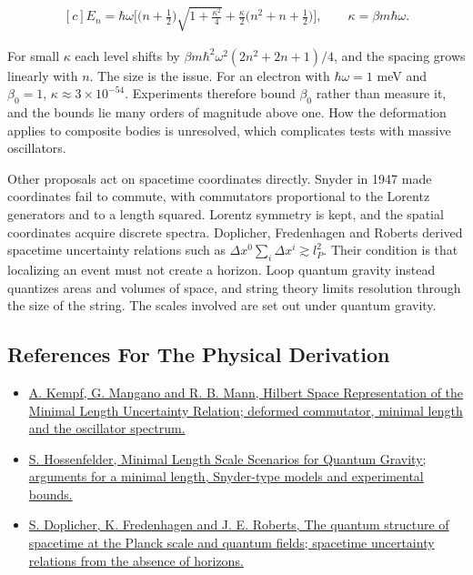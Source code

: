 \documentclass[11pt,oneside]{book}
\newenvironment{centeredalign}{\[\begin{gathered}[c]}{\end{gathered}\]}
\begin{document}
\begin{centeredalign}
E_n=\hbar\omega\Big[\big(n+\tfrac12\big)\sqrt{1+\tfrac{\kappa^2}{4}}+\frac\kappa2\big(n^2+n+\tfrac12\big)\Big],
\qquad \kappa=\beta m\hbar\omega.
\end{centeredalign}

For small \(\kappa\) each level shifts by \(\beta m\hbar^2\omega^2(2n^2+2n+1)/4\), and the spacing grows linearly with \(n\). The size is the issue. For an electron with \(\hbar\omega=1\) meV and \(\beta_0=1\), \(\kappa\approx3\times10^{-54}\). Experiments therefore bound \(\beta_0\) rather than measure it, and the bounds lie many orders of magnitude above one. How the deformation applies to composite bodies is unresolved, which complicates tests with massive oscillators.

Other proposals act on spacetime coordinates directly. Snyder in 1947 made coordinates fail to commute, with commutators proportional to the Lorentz generators and to a length squared. Lorentz symmetry is kept, and the spatial coordinates acquire discrete spectra. Doplicher, Fredenhagen and Roberts derived spacetime uncertainty relations such as \(\Delta x^0\sum_i\Delta x^i\gtrsim l_P^2\). Their condition is that localizing an event must not create a horizon. Loop quantum gravity instead quantizes areas and volumes of space, and string theory limits resolution through the size of the string. The scales involved are set out under quantum gravity.

\subsection*{References For The Physical Derivation}
\begin{itemize}
\item \href{https://arxiv.org/abs/hep-th/9412167}{A. Kempf, G. Mangano and R. B. Mann, Hilbert Space Representation of the Minimal Length Uncertainty Relation; deformed commutator, minimal length and the oscillator spectrum.}
\item \href{https://arxiv.org/abs/1203.6191}{S. Hossenfelder, Minimal Length Scale Scenarios for Quantum Gravity; arguments for a minimal length, Snyder-type models and experimental bounds.}
\item \href{https://arxiv.org/abs/hep-th/0303037}{S. Doplicher, K. Fredenhagen and J. E. Roberts, The quantum structure of spacetime at the Planck scale and quantum fields; spacetime uncertainty relations from the absence of horizons.}
\end{itemize}
\end{document}
